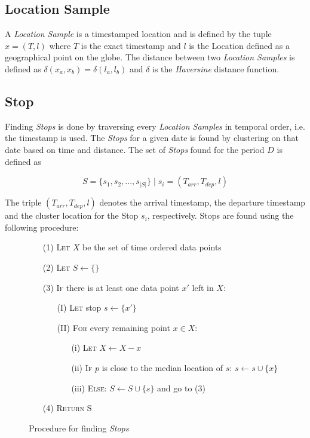 \subsection{Location Sample}
A \textit{Location Sample} is a timestamped location and is defined by the tuple $x = (T, l)$ where $T$ is the exact timestamp and $l$ is the Location defined as a geographical point on the globe. The distance between two \textit{Location Samples} is defined as $\delta(x_a, x_b) = \delta(l_a, l_b)$ and $\delta$ is the \textit{Haversine} distance function.

\subsection{Stop}
Finding \textit{Stops} is done by traversing every \textit{Location Samples} in temporal order, i.e. the timestamp is used. The \textit{Stops} for a given date is found by clustering  on that date based on time and distance. The set of \textit{Stops} found for the period $D$ is defined as

\begin{equation}
\label{eq:feature-stops}
S = \{s_1, s_2, ..., s_{|S|}\} \;| \; s_i = (T_{arr}, T_{dep}, l)
\end{equation}

The triple $(T_{arr}, T_{dep}, l)$ denotes the arrival timestamp, the departure timestamp and the cluster location for the Stop $s_i$, respectively. Stops are found using the following procedure:

\begin{figure}[h]
    \centering
    \begin{itemize}
        \item[(1)] \textsc{Let} $X$ be the set of time ordered data points
        \item[(2)] \textsc{Let} $S \leftarrow \{ \}$
        \item[(3)] \textsc{If} there is at least one data point $x'$ left in $X$:
            \begin{itemize}
                \item[(I)] \textsc{Let} stop $s \leftarrow \{ x' \}$
            \item[(II)] \textsc{For} every remaining point $x \in X$:
            \begin{itemize}
                \item[(i)] \textsc{Let} $X \leftarrow X - x$
                \item[(ii)] \textsc{If} $p$ is close to the median location of $s$: $s \leftarrow s \cup \{ x \}$
                \item[(iii)] \textsc{Else}: $S \leftarrow S \cup \{ s \}$ and go to \textsc{(3)}
            \end{itemize}
            \end{itemize}
        \item[(4)] \textsc{Return} S
    \end{itemize} 
    \caption{Procedure for finding \textit{Stops}}
    \label{fig:find_stops}
\end{figure}

